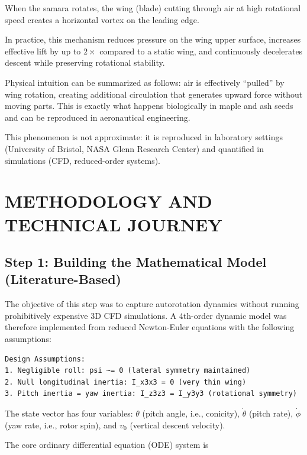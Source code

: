 \documentclass[12pt,a4paper]{article}
\begin{document}
When the samara rotates, the wing (blade) cutting through air at high rotational speed creates a horizontal vortex on the leading edge.

In practice, this mechanism reduces pressure on the wing upper surface, increases effective lift by up to $2\times$ compared to a static wing, and continuously decelerates descent while preserving rotational stability.

Physical intuition can be summarized as follows: air is effectively ``pulled'' by wing rotation, creating additional circulation that generates upward force without moving parts. This is exactly what happens biologically in maple and ash seeds and can be reproduced in aeronautical engineering.

This phenomenon is not approximate: it is reproduced in laboratory settings (University of Bristol, NASA Glenn Research Center) and quantified in simulations (CFD, reduced-order systems).

\vspace{0.5em}

\section{METHODOLOGY AND TECHNICAL JOURNEY}
\label{sec:methodology}

\subsection{Step 1: Building the Mathematical Model (Literature-Based)}

The objective of this step was to capture autorotation dynamics without running prohibitively expensive 3D CFD simulations. A 4th-order dynamic model was therefore implemented from reduced Newton-Euler equations with the following assumptions:

\begin{verbatim}
Design Assumptions:
1. Negligible roll: psi ~= 0 (lateral symmetry maintained)
2. Null longitudinal inertia: I_x3x3 = 0 (very thin wing)
3. Pitch inertia = yaw inertia: I_z3z3 = I_y3y3 (rotational symmetry)
\end{verbatim}

The state vector has four variables: $\theta$ (pitch angle, i.e., conicity), $\dot{\theta}$ (pitch rate), $\dot{\phi}$ (yaw rate, i.e., rotor spin), and $v_0$ (vertical descent velocity).

The core ordinary differential equation (ODE) system is
\end{document}
